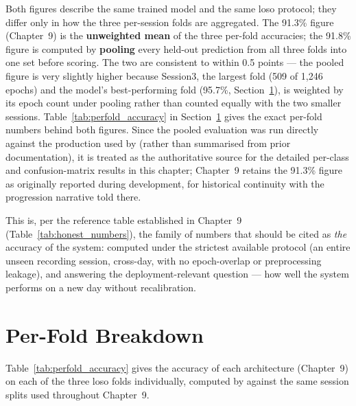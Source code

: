 Both figures describe the same trained model and the same
\acrshort{loso} protocol; they differ only in how the three
per-session folds are aggregated. The 91.3\% figure
(Chapter~9) is the \textbf{unweighted mean} of the three per-fold
accuracies; the 91.8\% figure is computed by \textbf{pooling} every
held-out prediction from all three folds into one set before
scoring. The two are consistent to within 0.5 points --- the pooled
figure is very slightly higher because Session3, the largest fold
(509 of 1{,}246 epochs) and the model's best-performing fold
(95.7\%, Section~\ref{sec:res_perfold}), is weighted by its epoch
count under pooling rather than counted equally with the two
smaller sessions. Table~\ref{tab:perfold_accuracy} in
Section~\ref{sec:res_perfold} gives the exact per-fold numbers
behind both figures. Since the pooled evaluation was run directly
against the production  used by
 (rather than summarised from prior
documentation), it is treated as the authoritative source for the
detailed per-class and confusion-matrix results in this chapter;
Chapter~9 retains the 91.3\% figure as originally reported during
development, for historical continuity with the progression
narrative told there.

This is, per the reference table established in Chapter~9
(Table~\ref{tab:honest_numbers}), the family of numbers that should
be cited as \emph{the} accuracy of the system: computed under the
strictest available protocol (an entire unseen recording session,
cross-day, with no epoch-overlap or preprocessing leakage), and
answering the deployment-relevant question --- how well the system
performs on a new day without recalibration.

\section{Per-Fold Breakdown}
\label{sec:res_perfold}

Table~\ref{tab:perfold_accuracy} gives the accuracy of each
architecture (Chapter~9) on each of the three \acrshort{loso}
folds individually, computed by  against the
same session splits used throughout Chapter~9.


